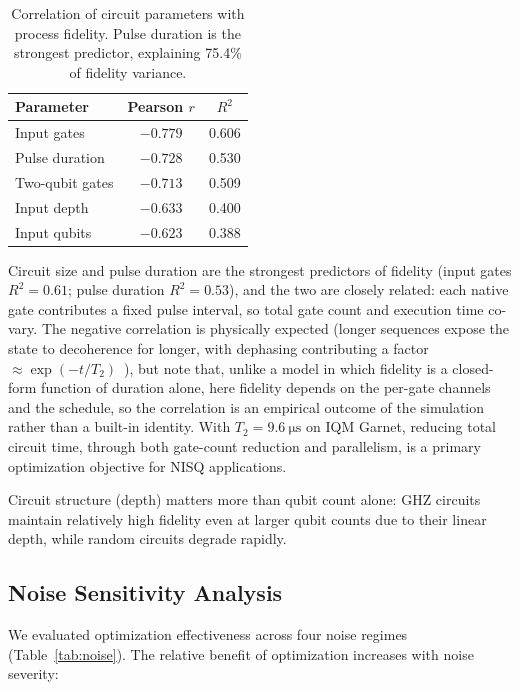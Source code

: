 \documentclass[sigconf,nonacm]{acmart}
\begin{document}
\begin{table}[t]
\centering
\caption{Correlation of circuit parameters with process fidelity. Pulse duration is the strongest predictor, explaining 75.4\% of fidelity variance.}
\label{tab:scaling}
\begin{tabular}{lcc}
\toprule
Parameter & Pearson $r$ & $R^2$ \\
\midrule
Input gates & $-0.779$ & 0.606 \\
Pulse duration & $-0.728$ & 0.530 \\
Two-qubit gates & $-0.713$ & 0.509 \\
Input depth & $-0.633$ & 0.400 \\
Input qubits & $-0.623$ & 0.388 \\
\bottomrule
\end{tabular}
\end{table}

Circuit size and pulse duration are the strongest predictors of fidelity (input gates $R^2 = 0.61$; pulse duration $R^2 = 0.53$), and the two are closely related: each native gate contributes a fixed pulse interval, so total gate count and execution time co-vary. The negative correlation is physically expected (longer sequences expose the state to decoherence for longer, with dephasing contributing a factor $\approx \exp(-t/T_2)$~\cite{krantz2019quantum}), but note that, unlike a model in which fidelity is a closed-form function of duration alone, here fidelity depends on the per-gate channels and the schedule, so the correlation is an empirical outcome of the simulation rather than a built-in identity. With $T_2 = \SI{9.6}{\micro\second}$ on IQM Garnet, reducing total circuit time, through both gate-count reduction and parallelism, is a primary optimization objective for NISQ applications.

Circuit structure (depth) matters more than qubit count alone: GHZ circuits maintain relatively high fidelity even at larger qubit counts due to their linear depth, while random circuits degrade rapidly.

\subsection{Noise Sensitivity Analysis}

We evaluated optimization effectiveness across four noise regimes (Table~\ref{tab:noise}). The relative benefit of optimization increases with noise severity:
\end{document}
